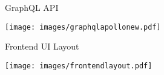 \documentclass[aspectratio = 169, 15pt, trans]{beamer}
\begin{document}
    \begin{frame}{GraphQL API}
        \begin{center}
            \vspace*{-3cm}
            \hspace*{-0.3cm}
            \texttt{[image: images/graphqlapollonew.pdf]}
        \end{center}
    \end{frame}
    
    \begin{frame}{Frontend UI Layout}
        \begin{center}
            \vspace*{-0.6cm}
            \texttt{[image: images/frontendlayout.pdf]}
        \end{center}
    \end{frame}
    
\end{document}
